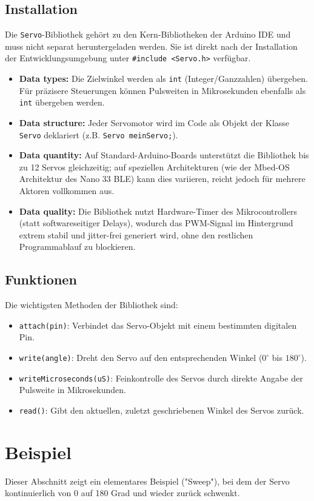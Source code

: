 \subsection{Installation}
Die \texttt{Servo}-Bibliothek gehört zu den Kern-Bibliotheken der Arduino IDE und muss nicht separat heruntergeladen werden. Sie ist direkt nach der Installation der Entwicklungsumgebung unter \texttt{\#include <Servo.h>} verfügbar.
\begin{itemize}
	\item \textbf{Data types:} Die Zielwinkel werden als \texttt{int} (Integer/Ganzzahlen) übergeben. Für präzisere Steuerungen können Pulsweiten in Mikrosekunden ebenfalls als \texttt{int} übergeben werden.
	\item \textbf{Data structure:} Jeder Servomotor wird im Code als Objekt der Klasse \texttt{Servo} deklariert (z.B. \texttt{Servo meinServo;}).
	\item \textbf{Data quantity:} Auf Standard-Arduino-Boards unterstützt die Bibliothek bis zu 12 Servos gleichzeitig; auf speziellen Architekturen (wie der Mbed-OS Architektur des Nano 33 BLE) kann dies variieren, reicht jedoch für mehrere Aktoren vollkommen aus.
	\item \textbf{Data quality:} Die Bibliothek nutzt Hardware-Timer des Mikrocontrollers (statt softwareseitiger Delays), wodurch das PWM-Signal im Hintergrund extrem stabil und jitter-frei generiert wird, ohne den restlichen Programmablauf zu blockieren.
\end{itemize}

\subsection{Funktionen}
Die wichtigsten Methoden der Bibliothek sind:
\begin{itemize}
	\item \texttt{attach(pin)}: Verbindet das Servo-Objekt mit einem bestimmten digitalen Pin.
	\item \texttt{write(angle)}: Dreht den Servo auf den entsprechenden Winkel ($0^\circ$ bis $180^\circ$).
	\item \texttt{writeMicroseconds(uS)}: Feinkontrolle des Servos durch direkte Angabe der Pulsweite in Mikrosekunden.
	\item \texttt{read()}: Gibt den aktuellen, zuletzt geschriebenen Winkel des Servos zurück.
\end{itemize}

\section{Beispiel}
Dieser Abschnitt zeigt ein elementares Beispiel ("Sweep"), bei dem der Servo kontinuierlich von 0 auf 180 Grad und wieder zurück schwenkt.

